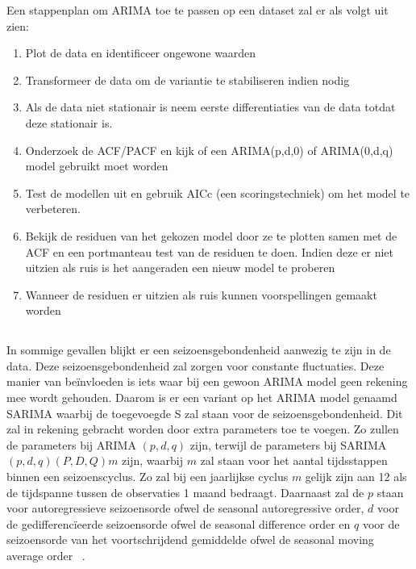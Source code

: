 Een stappenplan om ARIMA toe te passen op een dataset zal er als volgt uit zien:

\begin{enumerate}
    \item Plot de data en identificeer ongewone waarden
    \item Transformeer de data om de variantie te stabiliseren indien nodig
    \item Als de data niet stationair is neem eerste differentiaties van de data totdat deze stationair is.
    \item Onderzoek de ACF/PACF en kijk of een ARIMA(p,d,0) of ARIMA(0,d,q) model gebruikt moet worden
    \item Test de modellen uit en gebruik AICc (een scoringstechniek) om het model te verbeteren.
    \item Bekijk de residuen van het gekozen model door ze te plotten samen met de ACF en een portmanteau test van de residuen te doen. Indien deze er niet uitzien als ruis is het aangeraden een nieuw model te proberen
    \item Wanneer de residuen er uitzien als ruis kunnen voorspellingen gemaakt worden   
\end{enumerate}


\subsection{}

\subsubsection{}

In sommige gevallen blijkt er een seizoensgebondenheid aanwezig te zijn in de data. Deze seizoensgebondenheid zal zorgen voor constante fluctuaties.
Deze manier van be\"{i}nvloeden is iets waar bij een gewoon ARIMA model geen rekening mee wordt gehouden. Daarom is er een variant op het ARIMA model genaamd SARIMA waarbij de toegevoegde S zal staan voor de seizoensgebondenheid. Dit zal in rekening gebracht worden door extra parameters toe te voegen. Zo zullen de parameters bij ARIMA $(p,d,q)$ zijn, terwijl de parameters bij SARIMA $(p, d, q)(P, D, Q)m$ zijn, waarbij $m$ zal staan voor het aantal tijdsstappen binnen een seizoenscyclus. Zo zal bij een jaarlijkse cyclus $m$ gelijk zijn aan 12 als de tijdspanne tussen de observaties 1 maand bedraagt. Daarnaast zal de $p$ staan voor autoregressieve seizoensorde ofwel de seasonal autoregressive order, $d$ voor de gedifferenc\"{i}eerde seizoensorde ofwel de seasonal difference order en $q$ voor de seizoensorde van het voortschrijdend gemiddelde ofwel de seasonal moving average order ~\autocite{Brownlee2018a}.

